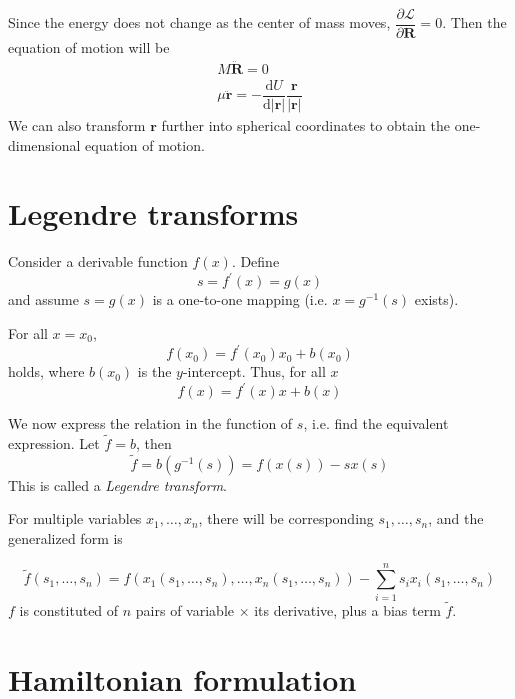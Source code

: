 \documentclass[
  10pt,
  twoside,
  openany,
  b5paper, %
  colorscheme = bootstrap-v4, %
]{qyxf-book}
\newcommand{\der}[2]{\dfrac{\md #1}{\md #2}}
\newcommand{\p}[2]{\dfrac{\partial #1}{\partial #2}}
\newcommand{\md}{\mathrm{d}}
\newcommand{\vr}{\boldsymbol{r}}
\newcommand{\ddvr}{\ddot{\vr}}
\newcommand{\lag}{\mathcal{L}} %
\begin{document}
Since the energy does not change as the center of mass moves, $\p{\lag}{\boldsymbol{R}}=0$. Then the equation of motion will be
\begin{gather*}
	M\ddot{\boldsymbol{R}}=0\\
	\mu\ddvr=-\der{U}{|\vr|}\dfrac{\vr}{|\vr|}
\end{gather*}
We can also transform $\vr$ further into spherical coordinates to obtain the one-dimensional equation of motion.

\section{Legendre transforms}

Consider a derivable function $f(x)$. Define
\begin{equation}
	s=f^\prime(x)=g(x)
\end{equation}
and assume $s=g(x)$ is a one-to-one mapping (i.e. $x=g^{-1}(s)$ exists).

For all $x=x_0$, 
\begin{equation*}
	f(x_0)=f^\prime(x_0)x_0+b(x_0)
\end{equation*}
holds, where $b(x_0)$ is the $y$-intercept. Thus, for all $x$
\begin{equation}
	f(x)=f^\prime(x)x+b(x)
\end{equation}

We now express the relation in the function of $s$, i.e. find the equivalent expression. Let $\tilde{f}=b$, then
\begin{equation}
	\tilde{f}=b(g^{-1}(s))=f(x(s))-sx(s)
\end{equation}
This is called a \textit{Legendre transform}.

For multiple variables $x_1, \dots, x_n$, there will be corresponding $s_1, \dots, s_n$, and the generalized form is
\begin{tcolorbox}
	\begin{equation}
		\tilde{f}(s_1, \dots, s_n)=f(x_1(s_1, \dots, s_n),\dots,x_n(s_1, \dots, s_n))-\sum_{i=1}^{n}s_ix_i(s_1, \dots, s_n)
	\end{equation}
	$f$ is constituted of $n$ pairs of variable $\times$ its derivative, plus a bias term $\tilde{f}$.
\end{tcolorbox}

\section{Hamiltonian formulation}
\end{document}

